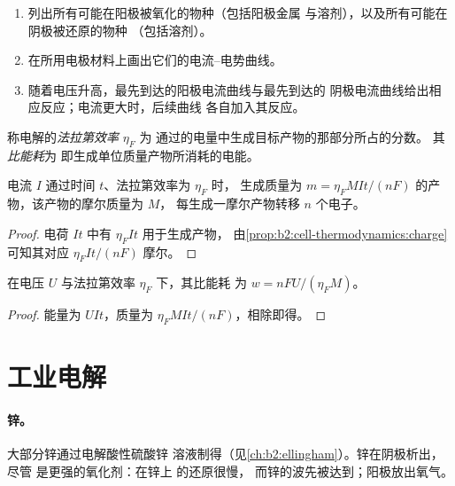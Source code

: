 \begin{method}[预测电解过程]\label{met:b2:batteries-electrolysis:predict-electrolysis}
\begin{enumerate}
  \item 列出所有可能在阳极被氧化的物种（包括阳极金属
        与溶剂），以及所有可能在阴极被还原的物种
        （包括溶剂）。
  \item 在所用电极材料上画出它们的电流–电势曲线。
  \item 随着电压升高，最先到达的阳极电流曲线与最先到达的
        阴极电流曲线给出相应反应；电流更大时，后续曲线
        各自加入其反应。
\end{enumerate}
\end{method}

\begin{definition}[法拉第效率]\label{def:b2:batteries-electrolysis:faradaic-efficiency}
称电解的\emph{法拉第效率} $\eta_F$ 为
通过的电量中生成目标产物的那部分所占的分数。
其\emph{比能耗}为
即生成单位质量产物所消耗的电能。
\end{definition}

\begin{proposition}[法拉第电磁感应定律]\label{prop:b2:batteries-electrolysis:faraday-mass}
电流 $I$ 通过时间 $t$、法拉第效率为 $\eta_F$ 时，
生成质量为 $m = \eta_F MIt/(nF)$ 的产物，该产物的摩尔质量为 $M$，
每生成一摩尔产物转移 $n$ 个电子。
\end{proposition}

\begin{proof}
电荷 $It$ 中有 $\eta_F It$ 用于生成产物，
由\cref{prop:b2:cell-thermodynamics:charge}可知其对应 $\eta_F It/(nF)$ 摩尔。
\end{proof}

\begin{proposition}[每千克能耗]\label{prop:b2:batteries-electrolysis:energy}
在电压 $U$ 与法拉第效率 $\eta_F$ 下，其比能耗
为 $w = nFU/(\eta_F M)$。
\end{proposition}

\begin{proof}
能量为 $UIt$，质量为 $\eta_F MIt/(nF)$，相除即得。
\end{proof}

\section{工业电解}

\paragraph{锌。} 大部分锌通过电解酸性硫酸锌
溶液制得（见\cref{ch:b2:ellingham}）。锌在阴极析出，尽管
 是更强的氧化剂：在锌上  的还原很慢，
而锌的波先被达到；阳极放出氧气。


